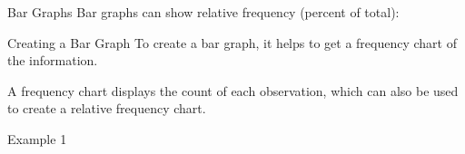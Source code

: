 \documentclass[t]{beamer}
\begin{document}
\begin{frame}{Bar Graphs}
Bar graphs can show relative frequency (percent of total):	\newline\\
\begin{center}
\end{center}
\end{frame}

\begin{frame}{Creating a Bar Graph}
To create a bar graph, it helps to get a frequency chart of the information. \newline\\	\pause

A frequency chart displays the count of each observation, which can also be used to create a relative frequency chart.
\end{frame}

\begin{frame}{Example 1}

\end{frame}

\end{document}
